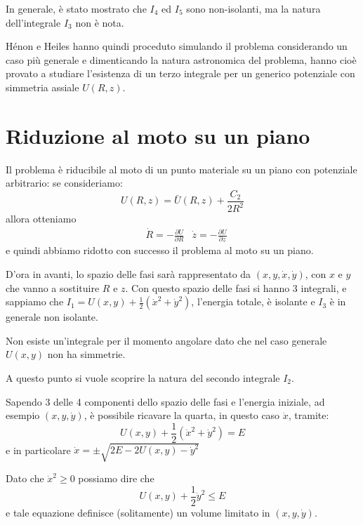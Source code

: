 \documentclass[a4paper]{article}
\numberwithin{equation}{section}
\numberwithin{figure}{section}
\begin{document}
In generale, è stato mostrato che $I_4$ ed $I_5$ sono non-isolanti, ma la natura dell'integrale
$I_3$ non è nota.

Hénon e Heiles hanno quindi proceduto simulando il problema considerando un caso più generale
e dimenticando la natura astronomica del problema, hanno cioè provato a studiare l'esistenza
di un terzo integrale per un generico potenziale con simmetria assiale $U(R,z)$.

\clearpage
\section{Riduzione al moto su un piano}
Il problema è riducibile al moto di un punto materiale su un piano con potenziale arbitrario:
se consideriamo:
\begin{equation}
	U(R,z) = \bar{U}(R,z) + \frac{C_2}{2R^2}
\end{equation}
allora otteniamo
\begin{align}
	&\dot{R} = -\frac{\partial U}{\partial R}&
	\dot{z} = -\frac{\partial U}{\partial z}
\end{align}
e quindi abbiamo ridotto con successo il problema al moto su un piano.

D'ora in avanti, lo spazio delle fasi sarà rappresentato da $(x,y,\dot{x},\dot{y})$,
con $x$ e $y$ che vanno a sostituire $R$ e $z$. Con questo spazio delle fasi si hanno 3 integrali,
e sappiamo che $I_1 = U(x,y)+\frac{1}{2}(\dot{x}^2+\dot{y}^2)$, l'energia totale, è isolante e $I_3$ è
in generale non isolante.

Non esiste un'integrale per il momento angolare dato che nel caso generale $U(x,y)$ non ha
simmetrie.

A questo punto si vuole scoprire la natura del secondo integrale $I_2$.

Sapendo 3 delle 4 componenti dello spazio delle fasi e l'energia iniziale, ad esempio $(x,y,\dot{y})$,
è possibile
ricavare la quarta, in questo caso $\dot{x}$, tramite:
\begin{equation}
	U(x,y)+\frac{1}{2}(\dot{x}^2+\dot{y}^2) = E \label{eq:consenergiaxy}
\end{equation}
e in particolare $\dot{x} = \pm \sqrt{2E-2U(x,y)-\dot{y}^2}$

Dato che $\dot{x}^2\ge0$ possiamo dire che
\begin{equation}
	U(x,y)+\frac{1}{2}\dot{y}^2 \le E
\end{equation}
e tale equazione definisce (solitamente) un volume limitato in $(x,y,\dot{y})$.
\end{document}
